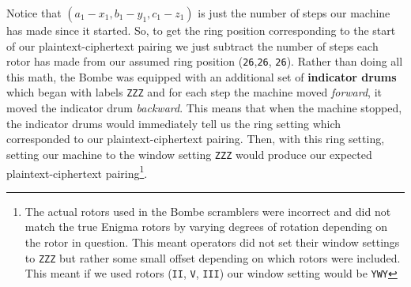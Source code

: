 Notice that $(a_1-x_1, b_1-y_1, c_1-z_1)$ is just the number of steps
our machine has made since it started. So, to get the ring position
corresponding to the start of our plaintext-ciphertext pairing we
just subtract the number of steps each rotor has made from our
assumed ring position (\texttt{26},\texttt{26}, \texttt{26}). Rather
than doing all this math, the Bombe was equipped with an additional
set of {\bf{indicator drums}} which began with labels \texttt{ZZZ}
and for each step the machine moved \emph{forward}, it moved the
indicator drum \emph{backward}. This means that when the machine
stopped, the indicator drums would immediately tell us the ring
setting which corresponded to our plaintext-ciphertext pairing. Then,
with this ring setting, setting our machine to the window setting
\texttt{ZZZ} would produce our expected plaintext-ciphertext
pairing\footnote{The actual rotors used in the Bombe scramblers were
	incorrect and did not match the true Enigma rotors by varying degrees
	of rotation depending on the rotor in question. This meant operators
	did not set their window settings to \texttt{ZZZ} but rather some
	small offset depending on which rotors were included. This meant if
	we used rotors (\texttt{II}, \texttt{V}, \texttt{III}) our window
	setting would be \texttt{YWY}}.

